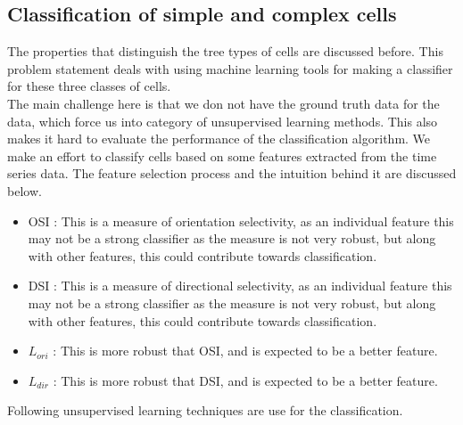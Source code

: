 \documentclass[11pt]{article}
\begin{document}
\subsection{Classification of simple and complex cells} %
\label{sub:classification_of_simple_and_complex_cells}
The properties that distinguish the tree types of cells are discussed before. This problem statement deals with using machine learning tools for making a classifier for these three classes of cells.\\
The main challenge here is that we don not have the ground truth data for the data, which force us into category of unsupervised learning methods. This also makes it hard to evaluate the performance of the classification algorithm. We make an effort to classify cells based on some features extracted from the time series data. The feature selection process and the intuition behind it are discussed below.
\begin{itemize}
    \item OSI : This is a measure of orientation selectivity, as an individual feature this may not be a strong classifier as the measure is not very robust, but along with other features, this could contribute towards classification.
    \item DSI : This is a measure of directional selectivity, as an individual feature this may not be a strong classifier as the measure is not very robust, but along with other features, this could contribute towards classification.
    \item $L_{ori}$ : This is more robust that OSI, and is expected to be a better feature.
    \item $L_{dir}$ : This is more robust that DSI, and is expected to be a better feature.
\end{itemize}
Following unsupervised learning techniques are use for the classification.
\end{document}
